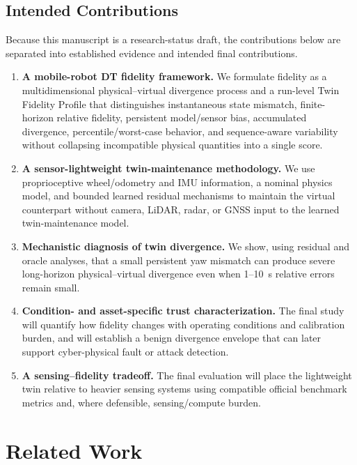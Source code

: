 \documentclass[conference]{IEEEtran}
\begin{document}
\subsection{Intended Contributions}
Because this manuscript is a research-status draft, the contributions below are separated into established evidence and intended final contributions.
\begin{enumerate}
    \item \textbf{A mobile-robot DT fidelity framework.} We formulate fidelity as a multidimensional physical--virtual divergence process and a run-level Twin Fidelity Profile that distinguishes instantaneous state mismatch, finite-horizon relative fidelity, persistent model/sensor bias, accumulated divergence, percentile/worst-case behavior, and sequence-aware variability without collapsing incompatible physical quantities into a single score.
    \item \textbf{A sensor-lightweight twin-maintenance methodology.} We use proprioceptive wheel/odometry and IMU information, a nominal physics model, and bounded learned residual mechanisms to maintain the virtual counterpart without camera, LiDAR, radar, or GNSS input to the learned twin-maintenance model.
    \item \textbf{Mechanistic diagnosis of twin divergence.} We show, using residual and oracle analyses, that a small persistent yaw mismatch can produce severe long-horizon physical--virtual divergence even when 1--10~s relative errors remain small.
    \item \textbf{Condition- and asset-specific trust characterization.} The final study will quantify how fidelity changes with operating conditions and calibration burden, and will establish a benign divergence envelope that can later support cyber-physical fault or attack detection.
    \item \textbf{A sensing--fidelity tradeoff.} The final evaluation will place the lightweight twin relative to heavier sensing systems using compatible official benchmark metrics and, where defensible, sensing/compute burden.
\end{enumerate}

\section{Related Work}
\end{document}
